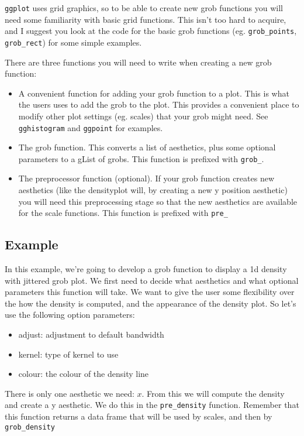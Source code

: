 \texttt{ggplot} uses grid graphics, so to be able to create new grob functions you will need some familiarity with basic grid functions.  This isn't too hard to acquire, and I suggest you look at the code for the basic grob functions (eg. \texttt{grob\_points}, \texttt{grob\_rect}) for some simple examples.

There are three functions you will need to write when creating a new grob function:

\begin{itemize}
	\item A convenient function for adding your grob function to a plot.  This is what the users uses to add the grob to the plot.  This provides a convenient place to modify other plot settings (eg. scales) that your grob might need.  See \texttt{gghistogram} and \texttt{ggpoint} for examples.
	\item The grob function.  This converts a list of aesthetics, plus some optional parameters to a gList of grobs.  This function is prefixed with \texttt{grob\_}.  
	\item The preprocessor function (optional).  If your grob function creates new aesthetics (like the densityplot will, by creating a new y position aesthetic) you will need this preprocessing stage so that the new aesthetics are available for the scale functions.  This function is prefixed with \texttt{pre\_}
\end{itemize}

\subsection{Example}\label{sub:example}

In this example, we're going to develop a grob function to display a 1d density with jittered grob plot.  We first need to decide what aesthetics and what optional parameters this function will take.  We want to give the user some flexibility over the how the density is computed, and the appearance of the density plot.  So let's use the following option parameters:

\begin{itemize}
	\item adjust: adjustment to default bandwidth
	\item kernel: type of kernel to use
	\item colour: the colour of the density line
\end{itemize}

There is only one aesthetic we need: $x$.  From this we will compute the density and create a y aesthetic.  We do this in the \texttt{pre\_density} function.  Remember that this function returns a data frame that will be used by scales, and then by \texttt{grob\_density}

